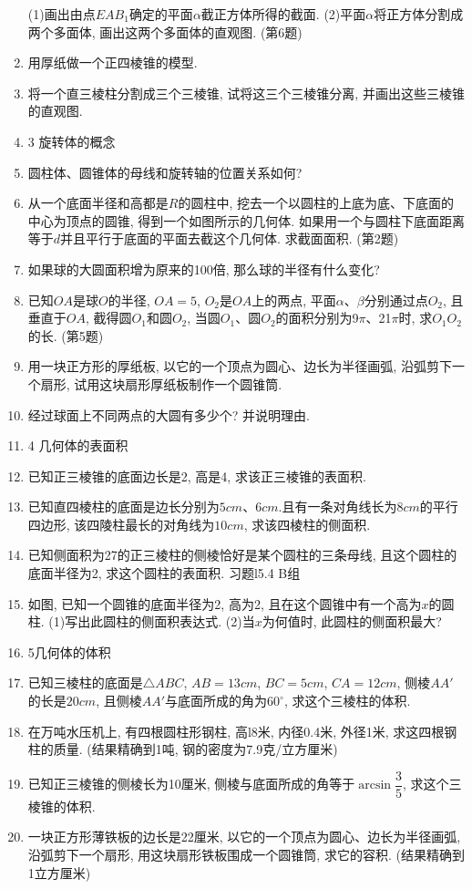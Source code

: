 \documentclass[10pt,a4paper]{article}
\begin{document}
\begin{enumerate}[1.]
(1)画出由点$EAB_1$确定的平面$\alpha$截正方体所得的截面.
(2)平面$\alpha$将正方体分割成两个多面体, 画出这两个多面体的直观图.
(第6题)
\item 用厚纸做一个正四棱锥的模型.
\item 将一个直三棱柱分割成三个三棱锥, 试将这三个三棱锥分离, 并画出这些三棱锥的直观图.
\item 3  旋转体的概念
\item 圆柱体、圆锥体的母线和旋转轴的位置关系如何?
\item 从一个底面半径和高都是$R$的圆柱中, 挖去一个以圆柱的上底为底、下底面的中心为顶点的圆锥, 得到一个如图所示的几何体. 如果用一个与圆柱下底面距离等于$d$并且平行于底面的平面去截这个几何体. 求截面面积.
(第2题)
\item 如果球的大圆面积增为原来的100倍, 那么球的半径有什么变化?
\item 已知$OA$是球$O$的半径, $OA=5$, $O_2$是$OA$上的两点, 平面$\alpha$、$\beta$分别通过点$O_2$, 且垂直于$OA$, 截得圆$O_1$和圆$O_2$, 当圆$O_1$、圆$O_2$的面积分别为9$\pi$、21$\pi$时, 求$O_1O_2$的长.
(第5题)
\item 用一块正方形的厚纸板, 以它的一个顶点为圆心、边长为半径画弧, 沿弧剪下一个扇形, 试用这块扇形厚纸板制作一个圆锥筒.
\item 经过球面上不同两点的大圆有多少个? 并说明理由.
\item 4  几何体的表面积
\item 已知正三棱锥的底面边长是2, 高是4, 求该正三棱锥的表面积.
\item 已知直四棱柱的底面是边长分别为$5cm$、$6cm$.且有一条对角线长为$8cm$的平行四边形, 该四陵柱最长的对角线为$10cm$, 求该四棱柱的侧面积.
\item 已知侧面积为27的正三棱柱的侧棱恰好是某个圆柱的三条母线, 且这个圆柱的底面半径为2, 求这个圆柱的表面积.
习题l5.4   B组
\item 如图, 已知一个圆锥的底面半径为2, 高为2, 且在这个圆锥中有一个高为$x$的圆柱.
(1)写出此圆柱的侧面积表达式.
(2)当$x$为何值时, 此圆柱的侧面积最大?
\item 5几何体的体积
\item 已知三棱柱的底面是$\triangle ABC$, $AB=13cm$, $BC=5cm$, $CA=12cm$, 侧棱$AA'$的长是$20cm$, 且侧棱$AA'$与底面所成的角为$60^\circ$, 求这个三棱柱的体积.
\item 在万吨水压机上, 有四根圆柱形钢柱, 高l8米, 内径0.4米, 外径1米, 求这四根钢柱的质量. (结果精确到1吨, 钢的密度为7.9克/立方厘米)
\item 已知正三棱锥的侧棱长为10厘米, 侧棱与底面所成的角等于$\arcsin \dfrac 35$, 求这个三棱锥的体积.
\item 一块正方形薄铁板的边长是22厘米, 以它的一个顶点为圆心、边长为半径画弧, 沿弧剪下一个扇形, 用这块扇形铁板围成一个圆锥筒, 求它的容积. (结果精确到1立方厘米)

\end{enumerate}
\end{document}
